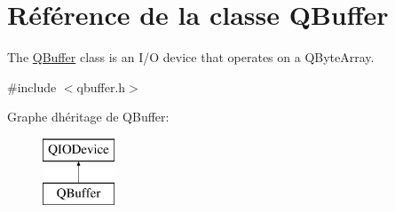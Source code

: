 \hypertarget{class_q_buffer}{}\section{Référence de la classe Q\+Buffer}
\label{class_q_buffer}


The \hyperlink{class_q_buffer}{Q\+Buffer} class is an I/\+O device that operates on a Q\+Byte\+Array.  




{\ttfamily \#include $<$qbuffer.\+h$>$}

Graphe d\textquotesingle{}héritage de Q\+Buffer\+:\begin{figure}[H]
\begin{center}
\leavevmode
\includegraphics[height=2.000000cm]{class_q_buffer}
\end{center}
\end{figure}
